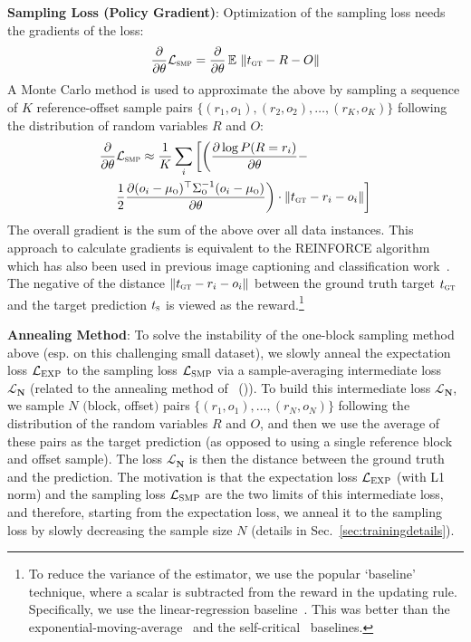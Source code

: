 \documentclass[letterpaper]{article} %
\newcommand{\newcite}[1]{\citeauthor{#1} (\citeyear{#1})}
\DeclareMathOperator{\E}{\mathbb{E}\,}
\begin{document}
\textbf{Sampling Loss (Policy Gradient)}:
Optimization of the sampling loss needs the gradients of the loss:
\begin{align}
\frac{\partial}{\partial \theta} \mathcal{L}_\textsc{smp} = \frac{\partial}{\partial \theta} \E \left \Vert t_\textsc{gt} - R - O \right \Vert
\end{align}
A Monte Carlo method is used to approximate the above by sampling a sequence of $K$ reference-offset sample pairs
$\{(r_1, o_1), (r_2, o_2), \ldots, (r_K, o_K)\}$
following the distribution of random variables $R$ and $O$:
\begin{align}
\frac{\partial}{\partial \theta} &\mathcal{L}_\textsc{smp} \approx \frac{1}{K} \sum_i\bigg[\bigg(\frac{\partial \log P(R = r_i)}{\partial \theta} - \nonumber \\
&\frac{1}{2}\frac{\partial (o_i-\mu_\textsc{o})^{\top}\Sigma_\textsc{o}^{-1}(o_i-\mu_\textsc{o})}{\partial \theta}\bigg) \cdot \Vert t_\textsc{gt} - r_i - o_i \Vert \bigg]
\end{align}
The overall gradient is the sum of the above over all data instances. This approach to calculate gradients is equivalent to the REINFORCE algorithm~\cite{williams1992simple}
which has also been used in previous image captioning and classification work~\cite{xu2015show,mnih2014recurrent}.
The negative of the distance $\Vert t_\textsc{gt} - r_i - o_i \Vert$ between the ground truth target $t_\textsc{gt}$ and the target prediction $t_\textsc{s}$ is viewed as the reward.\footnote{To reduce the variance of the estimator, we use the popular `baseline' technique, where a scalar is subtracted from the reward in the updating rule. Specifically, we use the linear-regression baseline~\cite{williams1992simple,ranzato2015sequence}. This was better than the exponential-moving-average~\cite{williams1992simple} and the self-critical~\cite{Rennie2016self} baselines.
}

\textbf{Annealing Method}:
To solve the instability of the one-block sampling method above (esp. on this challenging small dataset), we slowly anneal the expectation loss $\mathcal{L}_\textsc{EXP}$ to the sampling loss $\mathcal{L}_\textsc{SMP}$ via a sample-averaging intermediate loss $\mathcal{L}_\mathbf{N}$ (related to the annealing method of~\newcite{ranzato2015sequence}).
To build this intermediate loss $\mathcal{L}_\mathbf{N}$, we sample $N$ $($block, offset$)$ pairs $\{(r_1, o_1), \ldots, (r_N, o_N)\}$ following the distribution of the random variables $R$ and $O$, and then we use the average of these pairs as the target prediction (as opposed to using a single reference block and offset sample). The loss $\mathcal{L}_\mathbf{N}$ is then the distance between the ground truth and the prediction.
The motivation is that the expectation loss $\mathcal{L}_{\textsc{EXP}}$ (with L1 norm) and the sampling loss $\mathcal{L}_{\textsc{SMP}}$ are the two limits of this intermediate loss,
and therefore, starting from the expectation loss, we anneal it to the sampling loss by slowly decreasing the sample size $N$ (details in Sec.~\ref{sec:trainingdetails}).
\end{document}
